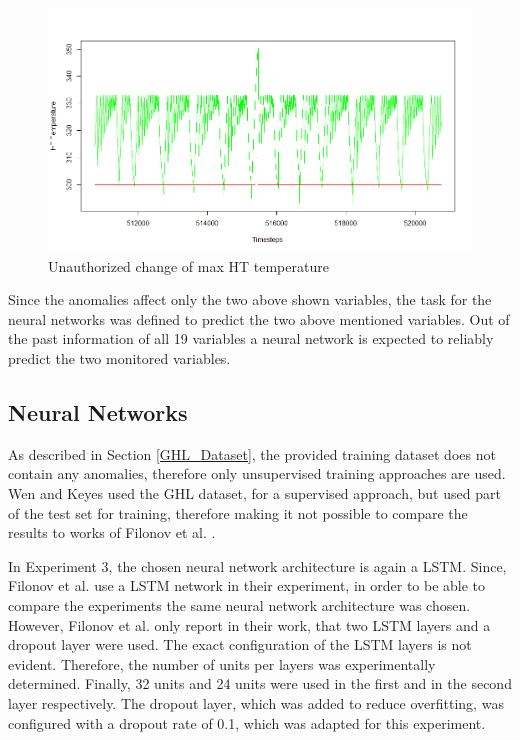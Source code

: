 \begin{figure}[h]
	\centering
	\includegraphics[scale=0.4]{Figures/anomaly_max_HT_temp}
	\decoRule
	\caption[Unauthorized change of max HT temperature]{Unauthorized change of max HT temperature \parencite{Own}}
	\label{fig:anomaly_max_HT_temp}
\end{figure}

Since the anomalies affect only the two above shown variables, the task for the neural networks was defined to predict the two above mentioned variables. Out of the past information of all 19 variables a neural network is expected to reliably predict the two monitored variables.

\subsection{Neural Networks}
As described in Section \ref{GHL_Dataset}, the provided training dataset does not contain any anomalies, therefore only unsupervised training approaches are used. Wen and Keyes \parencite*{Wen2019} used the GHL dataset, for a supervised approach, but used part of the test set for training, therefore making it not possible to compare the results to works of Filonov et al. \parencite*{Filonov2016}.

In Experiment 3, the chosen neural network architecture is again a LSTM. Since, Filonov et al. \parencite*{Filonov2016} use a LSTM network in their experiment, in order to be able to compare the experiments the same neural network architecture was chosen. However, Filonov et al. only report in their work, that two LSTM layers and a dropout layer were used. The exact configuration of the LSTM layers is not evident. Therefore, the number of units per layers was experimentally determined. Finally, 32 units and 24 units were used in the first and in the second layer respectively. The dropout layer, which was added to reduce overfitting, was configured with a dropout rate of 0.1, which was adapted for this experiment. 

